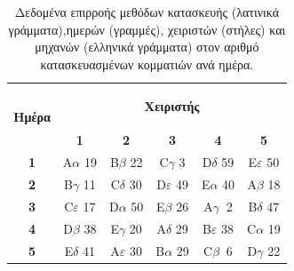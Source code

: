 \documentclass[12pt]{article}
\begin{document}
\begin{table}[H]
\centering
\begin{otherlanguage}{english}
\begin{tabular}{c|ccccc}
\multirow{2}{*}{\begin{otherlanguage}{greek}\textbf{\textbf{Ημέρα}}\end{otherlanguage}} & \multicolumn{5}{c}{\begin{otherlanguage}{greek}\textbf{\textbf{Χειριστής}}\end{otherlanguage}}                                                                                                                                         \\
                       & \multicolumn{1}{c|}{\textbf{1}}              & \multicolumn{1}{c|}{\textbf{2}}              & \multicolumn{1}{c|}{\textbf{3}}              & \multicolumn{1}{c|}{\textbf{4}}              & \textbf{5}              \\ \hline
\textbf{1}                      & \multicolumn{1}{c|}{A$\alpha$ 19}   & \multicolumn{1}{c|}{B$\beta$ 22}    & \multicolumn{1}{c|}{C$\gamma$ 3}    & \multicolumn{1}{c|}{D$\delta$ 59}   & E$\varepsilon$ 50 \\
\textbf{2}                      & \multicolumn{1}{c|}{B$\gamma$ 11}   & \multicolumn{1}{c|}{C$\delta$ 30}   & \multicolumn{1}{c|}{D$\varepsilon$ 49} & \multicolumn{1}{c|}{E$\alpha$ 40}   & A$\beta$ 18     \\
\textbf{3}                      & \multicolumn{1}{c|}{C$\varepsilon$ 17} & \multicolumn{1}{c|}{D$\alpha$ 50}   & \multicolumn{1}{c|}{E$\beta$ 26}    & \multicolumn{1}{c|}{A$\gamma \ $ 2}    & B$\delta$ 47   \\
\textbf{4}                      & \multicolumn{1}{c|}{D$\beta$ 38}    & \multicolumn{1}{c|}{E$\gamma$ 20}   & \multicolumn{1}{c|}{A$\delta$ 29}   & \multicolumn{1}{c|}{B$\varepsilon$ 38} & C$\alpha$ 19   \\
\textbf{5}                      & \multicolumn{1}{c|}{E$\delta$ 41}   & \multicolumn{1}{c|}{A$\varepsilon$ 30} & \multicolumn{1}{c|}{B$\alpha$ 29}   & \multicolumn{1}{c|}{C$\beta \ $ 6}     & D$\gamma$ 22  
\end{tabular}
\end{otherlanguage}
\captionsetup{justification=centering,margin=2cm}
\caption{Δεδομένα επιρροής μεθόδων κατασκευής (λατινικά γράμματα),ημερών (γραμμές), χειριστών (στήλες) και μηχανών (ελληνικά γράμματα) στον αριθμό κατασκευασμένων κομματιών ανά ημέρα.}
\end{table}
\end{document}
